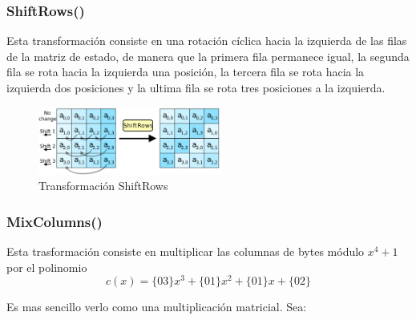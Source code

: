 \documentclass[peerreview]{IEEEtran}
\begin{document}
\subsubsection{ShiftRows()}
Esta transformación consiste en una rotación cíclica hacia la izquierda de las filas de la matriz de estado, de manera que la primera fila permanece igual, la segunda fila se rota hacia la izquierda una posición, la tercera fila se rota hacia la izquierda dos posiciones y la ultima fila se rota tres posiciones a la izquierda. 
\begin{figure}[h]
\includegraphics[width=6cm]{figuras/ShiftRows.png}
\centering
\caption{Transformación ShiftRows}
\label{fig: 4}
\end{figure}

\subsubsection{MixColumns()}
Esta trasformación consiste en multiplicar las columnas de bytes módulo $x^4 + 1$ por el polinomio
    $$c(x)=\{03\}x^3 + \{01\}x^2 + \{01\}x + \{02\}$$
    
Es mas sencillo verlo como una multiplicación matricial. Sea:
\end{document}
